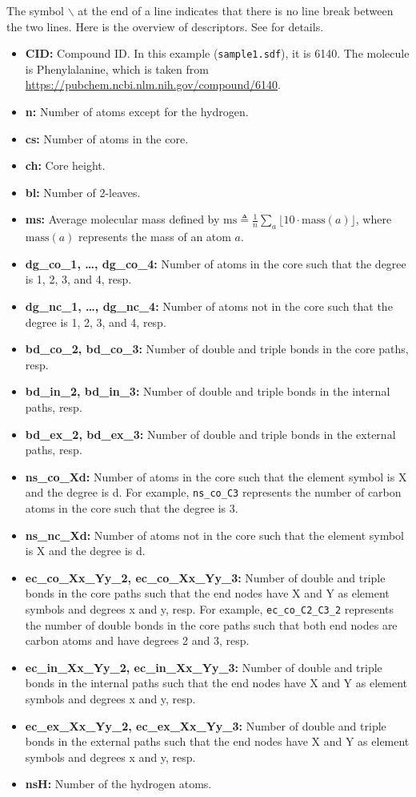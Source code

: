 \documentclass[11pt,titlepage,dvipdfmx,twoside]{book}
\begin{document}
The symbol $\backslash$ at the end of a line
indicates that there is no line break between the two lines.
Here is the overview of descriptors. See \cite{AN20} for details. 

\begin{itemize}
\item {\bf CID:} Compound ID. In this example ({\tt sample1.sdf}), it is 6140. The molecule is Phenylalanine, which is taken from \url{https://pubchem.ncbi.nlm.nih.gov/compound/6140}.
\item {\bf n:}  Number of atoms except for the hydrogen.
\item {\bf cs:} Number of atoms in the core.
\item {\bf ch:} Core height.
\item {\bf bl:} Number of 2-leaves.
\item {\bf ms:} Average molecular mass defined by 
	  $\textrm{ms}\triangleq\frac{1}{n}\sum_{a}\lfloor 10 \cdot \textrm{mass}(a)\rfloor$, 
	  where $\textrm{mass}(a)$ represents the mass of an atom $a$.
\item {\bf dg\_co\_1, \dots, dg\_co\_4:} Number of atoms in the core such that the degree is 1, 2, 3, and 4, resp.
\item {\bf dg\_nc\_1, \dots, dg\_nc\_4:} Number of atoms not in the core such that the degree is 1, 2, 3, and 4, resp.
\item {\bf bd\_co\_2, bd\_co\_3:} Number of double and triple bonds in the core paths, resp.
\item {\bf bd\_in\_2, bd\_in\_3:} Number of double and triple bonds in the internal paths, resp.
\item {\bf bd\_ex\_2, bd\_ex\_3:} Number of double and triple bonds in the external paths, resp.
\item {\bf ns\_co\_Xd:} Number of atoms in the core such that the element symbol is X and the degree is d. For example, {\tt ns\_co\_C3} represents the number of carbon atoms in the core such that the degree is 3. 
\item {\bf ns\_nc\_Xd:} Number of atoms not in the core such that the element symbol is X and the degree is d.
\item {\bf ec\_co\_Xx\_Yy\_2, ec\_co\_Xx\_Yy\_3:} Number of double and triple bonds in the core paths such that the end nodes have X and Y as element symbols and degrees x and y, resp. For example, {\tt ec\_co\_C2\_C3\_2} represents the number of double bonds in the core paths such that both end nodes are carbon atoms and have degrees 2 and 3, resp. 
\item {\bf ec\_in\_Xx\_Yy\_2, ec\_in\_Xx\_Yy\_3:}
  Number of double and triple bonds in the internal paths such that the end nodes have X and Y as element symbols and degrees x and y, resp.
\item {\bf ec\_ex\_Xx\_Yy\_2, ec\_ex\_Xx\_Yy\_3:}
  Number of double and triple bonds in the external paths such that the end nodes have X and Y as element symbols and degrees x and y, resp.
\item {\bf nsH:} Number of the hydrogen atoms. 
\end{itemize}
\end{document}

